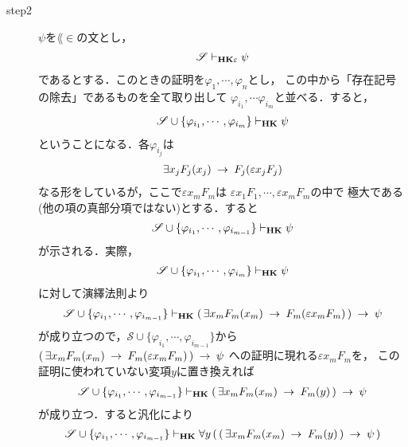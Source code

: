 \begin{description}
		\item[step2]
			$\psi$を$\lang{\in}$の文とし，
			\begin{align}
				\mathscr{S} \vdash_{{\scriptsize \mbox{{\bf HK$\varepsilon$}}}} \psi
			\end{align}
			であるとする．このときの証明を$\varphi_{1},\cdots,\varphi_{n}$とし，
			この中から「存在記号の除去」であるものを全て取り出して
			$\varphi_{i_{1}},\cdots\varphi_{i_{m}}$と並べる．すると，
			\begin{align}
				\mathscr{S} \cup \{\varphi_{i_{1}},\cdots,\varphi_{i_{m}}\} 
				\vdash_{{\scriptsize \mbox{{\bf HK}}}} \psi
			\end{align}
			ということになる．各$\varphi_{i_{j}}$は
			\begin{align}
				\exists x_{j} F_{j}(x_{j}) \hspace{0.25em}\rightarrow\hspace{0.25em} F_{j}(\varepsilon x_{j} F_{j})
			\end{align}
			なる形をしているが，ここで$\varepsilon x_{m} F_{m}$は
			$\varepsilon x_{1} F_{1},\cdots,\varepsilon x_{m} F_{m}$の中で
			極大である(他の項の真部分項ではない)とする．すると
			\begin{align}
				\mathscr{S} \cup \{\varphi_{i_{1}},\cdots,\varphi_{i_{m-1}}\} 
				\vdash_{{\scriptsize \mbox{{\bf HK}}}} \psi
			\end{align}
			が示される．実際，
			\begin{align}
				\mathscr{S} \cup \{\varphi_{i_{1}},\cdots,\varphi_{i_{m}}\} 
				\vdash_{{\scriptsize \mbox{{\bf HK}}}} \psi
			\end{align}
			に対して演繹法則より
			\begin{align}
				\mathscr{S} \cup \{\varphi_{i_{1}},\cdots,\varphi_{i_{m-1}}\} 
				\vdash_{{\scriptsize \mbox{{\bf HK}}}} 
				(\, \exists x_{m} F_{m}(x_{m}) \hspace{0.25em}\rightarrow\hspace{0.25em} F_{m}(\varepsilon x_{m} F_{m})\, ) \hspace{0.25em}\rightarrow\hspace{0.25em} \psi
			\end{align}
			が成り立つので，$\mathscr{S} \cup \{\varphi_{i_{1}},\cdots,\varphi_{i_{m-1}}\}$から
			$(\, \exists x_{m} F_{m}(x_{m}) \hspace{0.25em}\rightarrow\hspace{0.25em} F_{m}(\varepsilon x_{m} F_{m})\, ) \hspace{0.25em}\rightarrow\hspace{0.25em} \psi$
			への証明に現れる$\varepsilon x_{m} F_{m}$を，
			この証明に使われていない変項$y$に置き換えれば
			\begin{align}
				\mathscr{S} \cup \{\varphi_{i_{1}},\cdots,\varphi_{i_{m-1}}\} 
				\vdash_{{\scriptsize \mbox{{\bf HK}}}} 
				(\, \exists x_{m} F_{m}(x_{m}) \hspace{0.25em}\rightarrow\hspace{0.25em} F_{m}(y)\, ) \hspace{0.25em}\rightarrow\hspace{0.25em} \psi
			\end{align}
			が成り立つ．すると汎化により
			\begin{align}
				\mathscr{S} \cup \{\varphi_{i_{1}},\cdots,\varphi_{i_{m-1}}\} 
				\provable{\mbox{{\bf HK}}} 
				\forall y\, (\, (\, \exists x_{m} F_{m}(x_{m}) \rarrow F_{m}(y)\, ) \rarrow \psi\, )

\end{align}
\end{description}
